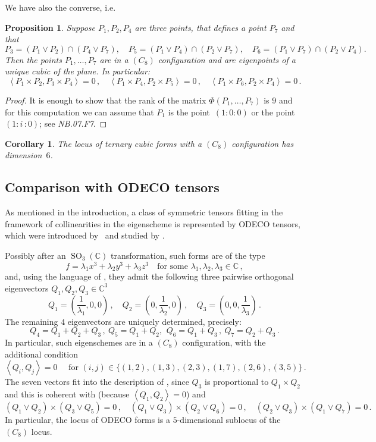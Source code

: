 \documentclass[a4paper, 11pt, reqno]{amsart}
\theoremstyle{plain}
\newtheorem{prop}[lemma]{Proposition}
\newtheorem{corollary}[lemma]{Corollary}
\theoremstyle{definition}
\newcommand{\C}{\mathbb{C}}
\newcommand{\nb}[2]{\textsl{{NB}.{#1}.{#2}}}
\newcommand{\iii}{\textit{i}\,}
\newcommand{\SO}{\operatorname{SO}}
\newcommand{\scl}[2]{\left\langle {#1}, {#2} \right\rangle}
\begin{document}
We have also the converse, i.e.\
\begin{prop}
Suppose $P_1, P_2, P_4$ are three points, that  defines a point $P_7$ and that
%
\[
P_3 = (P_1 \vee P_2) \cap(P_4 \vee P_7), \quad
P_5 = (P_1 \vee P_4) \cap (P_2 \vee P_7), \quad
P_6 = (P_1 \vee P_7) \cap (P_2 \vee P_4).
\]
%
Then the points $P_1, \dotsc, P_7$ are in a $(C_8)$ configuration
and are eigenpoints of a unique cubic
of the plane. In particular:
\[
  \scl{P_1 \times P_2}{P_3 \times P_4} = 0 \,, \quad
  \scl{P_1 \times P_4}{P_2 \times P_5} = 0 \,, \quad
  \scl{P_1 \times P_6}{P_2 \times P_4} = 0 \,.
\]
\end{prop}
\begin{proof}
It is enough to show that the rank of the matrix $\Phi(P_1, \dots, P_7)$
is $9$ and for this computation we can assume that
$P_1$ is the point~$(1: 0: 0)$ or the point~$(1: \iii: 0)$;
see \nb{07}{F7}.
\end{proof}

\begin{corollary}
The locus of ternary cubic forms with a $(C_8)$ configuration has dimension~$6$.
\end{corollary}


\subsection*{Comparison with ODECO tensors}
As mentioned in the introduction, a class of
symmetric tensors fitting in the framework of collinearities in the eigenscheme is represented by ODECO tensors, which were introduced by~\cite{Rob} and studied by \cite{BDHE, Koiran2021, Biaggi2022}.

Possibly after an $\SO_3(\C)$ transformation, such forms are of the type
%
\[
  f = \lambda_1 x^3 +\lambda_2 y^3 + \lambda_3 z^3
  \quad \text{for some } \lambda_1, \lambda_2, \lambda_3 \in \C \,,
\]
%
and, using the language of \cite{Rob}, they admit the following three pairwise orthogonal eigenvectors $Q_1, Q_2, Q_3 \in \C^3$
%
\[
  Q_1 = \left( \frac{1}{\lambda_1},0,0 \right) \,, \quad
  Q_2 = \left( 0,\frac{1}{\lambda_2},0 \right) \,, \quad
  Q_3 = \left( 0,0,\frac{1}{\lambda_3} \right) \,.
\]
%
The remaining $4$ eigenvectors are uniquely determined, precisely:
%
\[
  Q_4 = Q_1+Q_2+Q_3\,, \ Q_5 = Q_1+Q_2,\, \ Q_6 = Q_1+Q_3 \,, \ Q_7 = Q_2+Q_3\,.
\]
%
In particular, such eigenschemes are in a $(C_8)$ configuration, with the additional condition
%
\[
  \left\langle Q_i,Q_j \right\rangle = 0
  \quad \text{ for } (i, j) \in \{(1, 2), (1, 3), (2, 3), (1, 7), (2, 6), (3, 5)\} \,.
\]
%
The seven vectors fit into the description of , since $Q_3 $ is proportional to $Q_1 \times Q_2$ and this is coherent with 
(because $\scl{Q_1}{Q_2} = 0$)
and
%
\[
  (Q_1 \vee Q_2) \times (Q_3 \vee Q_5) = 0 \,, \quad
  (Q_1 \vee Q_3) \times (Q_2 \vee Q_6) = 0 \,, \quad
  (Q_2 \vee Q_3) \times (Q_1 \vee Q_7) = 0 \,.
\]
%
In particular, the locus of ODECO forms is a $5$-dimensional sublocus of the $(C_8)$ locus.
\end{document}
